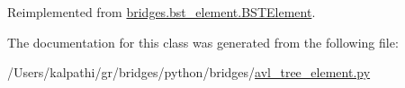 Reimplemented from \mbox{\hyperlink{classbridges_1_1bst__element_1_1_b_s_t_element_a978ae0db366dee59703ed266eebca0e9}{bridges.\+bst\+\_\+element.\+B\+S\+T\+Element}}.



The documentation for this class was generated from the following file\+:\begin{DoxyCompactItemize}
\item 
/\+Users/kalpathi/gr/bridges/python/bridges/\mbox{\hyperlink{avl__tree__element_8py}{avl\+\_\+tree\+\_\+element.\+py}}\end{DoxyCompactItemize}
